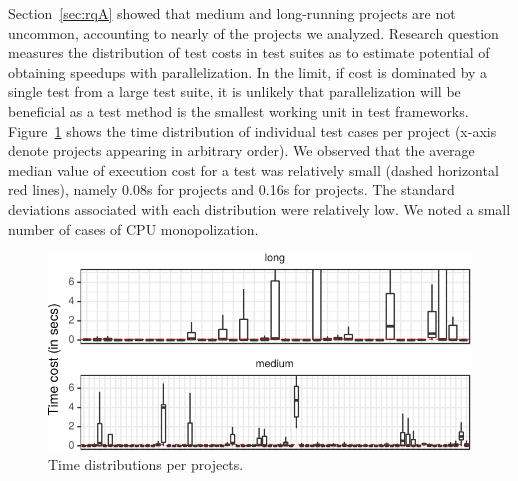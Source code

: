 Section~\ref{sec:rqA} showed that medium and long-running projects are
not uncommon, accounting to nearly \percentMedLongRunning{} of the
\numSubjs{} projects we analyzed.  Research question \numRQFeasibilityTwo{}
measures the distribution of test costs in test suites as to estimate
potential of obtaining speedups with parallelization.  In
the limit, if cost is dominated by a single test from a large test
suite, it is unlikely that parallelization will be beneficial as a
test method is the smallest working unit in test frameworks.
Figure~\ref{fig:time-distributions} shows the time distribution of
individual test cases per project (x-axis denote projects appearing in
arbitrary order).
We observed that the average median value of execution cost for a
test was relatively small (dashed horizontal red lines), namely 0.08s
for \medg{} projects and 0.16s for \longg{} projects.
The standard deviations associated with each distribution were
relatively low.  We noted a small
number of cases of CPU monopolization.

\begin{figure}[t!]
  \centering
  \includegraphics[width=.48\textwidth]{results/testcost-distribution.pdf}
  \caption{\label{fig:time-distributions}Time distributions per projects.}%
  \vspace{-3ex}
\end{figure}

